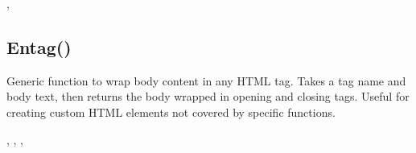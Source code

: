 \documentclass[letterpaper,10pt,english]{sphinxmanual}
\begin{document}
\sphinxAtStartPar
{}

\sphinxAtStartPar
{}, 

\ignorespaces 

\subsection{Entag()}
\label{\detokenize{reference/html:entag}}\label{\detokenize{reference/html:index-3}}
\sphinxAtStartPar
{}

\sphinxAtStartPar
Generic function to wrap body content in any HTML tag. Takes a tag name and body text, then returns the body wrapped in opening and closing tags. Useful for creating custom HTML elements not covered by specific functions.

\sphinxAtStartPar
{}

\begin{sphinxVerbatim}[commandchars=\\\{\}]
\end{sphinxVerbatim}

\sphinxAtStartPar
{}

\begin{sphinxVerbatim}[commandchars=\\\{\}]

\end{sphinxVerbatim}

\sphinxAtStartPar
{}

\sphinxAtStartPar
{}, , , 
\end{document}
